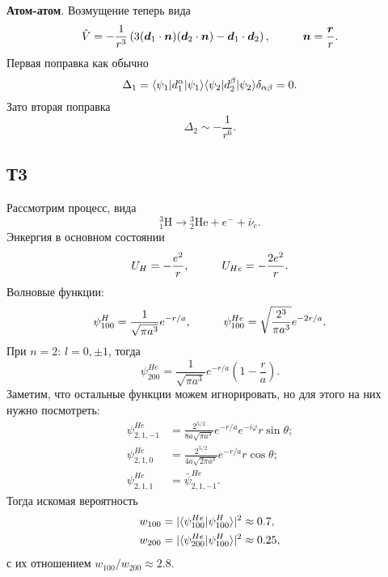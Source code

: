 \textbf{Атом-атом}. Возмущение теперь вида
\begin{equation*}
    \hat{V} = - \frac{1}{r^3} \left(
        3 (\vc{d}_1 \cdot \vc{n}) (\vc{d}_2 \cdot \vc{n}) - \vc{d}_1 \cdot \vc{d}_2
    \right),
    \hspace{10 mm} 
    \vc{n} = \frac{\vc{r}}{r}.
\end{equation*}
Первая поправка как обычно
\begin{equation*}
    \Delta_1 = \bk{\psi_1}[d_1^\alpha]{\psi_1} \bk{\psi_2}[d_2^\beta]{\psi_2} \delta_{\alpha \beta} = 0.
\end{equation*}
Зато вторая поправка
\begin{equation*}
    \Delta_2 \sim - \frac{1}{r^6}.
\end{equation*}




\subsection*{Т3}

Рассмотрим процесс, вида
\begin{equation*}
    {}^3_1 \text{H} \longrightarrow {}_2^3 \text{He} + e^- + \bar{\nu}_e.
\end{equation*}
Энкергия в основном состоянии
\begin{equation*}
    U_H = - \frac{e^2}{r},
    \hspace{10 mm} 
    U_{He} = - \frac{2 e^2}{r}.
\end{equation*}
Волновые функции:
\begin{equation*}
    \psi^H_{100} = \frac{1}{\sqrt{\pi a^3}} e^{-r/a},
    \hspace{10 mm} 
    \psi^{He}_{100} = \sqrt{\frac{2^3}{\pi a^3}} e^{-2r/a}.
\end{equation*}
При $n=2$: $l = 0, \pm 1$, тогда
\begin{equation*}
    \psi^{He}_{200} = \frac{1}{\sqrt{\pi a^3}} e^{- r/a} \left(1 - \frac{r}{a}\right).
\end{equation*}
Заметим, что остальные функции можем игнорировать, но для этого на них нужно посмотреть:
\begin{align*}
    \psi_{2,1,-1}^{He} &= \frac{2^{5/2}}{8 a \sqrt{\pi a^3}} e^{-r/a} e^{- i \varphi} r \sin \theta; \\
    \psi_{2,1,0}^{He} &= \frac{2^{5/2}}{4 a \sqrt{2 \pi a^3} } e^{-r/a} r \cos \theta; \\
    \psi_{2,1,1}^{He} &= \bar{\psi}_{2,1,-1}^{He}.
\end{align*}
Тогда искомая вероятность
\begin{align*}
    w_{100} &= |\bk{\psi^{He}_{100}}{\psi^H_{100}}|^2 \approx 0.7, \\ 
    w_{200} &= |\bk{\psi^{He}_{200}}{\psi^H_{100}}|^2 \approx 0.25,
\end{align*}
с их отношением $w_{100} / w_{200} \approx 2.8$.



